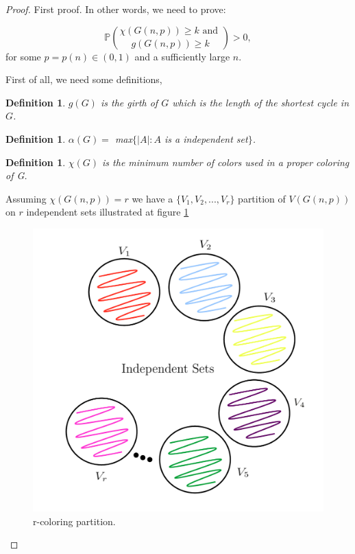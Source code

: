 \documentclass[12pt,twoside,a4paper]{book}
\numberwithin{equation}{section}
\newtheorem{definition}	[theorem] {Definition}
\theoremstyle{remark}
\begin{document}
\begin{proof} First proof.
In other words, we need to prove:

$$\mathbb{P}\binom{\chi(G(n,p)) \geq k \text{ and }} {g(G(n,p)) \geq k} > 0 ,$$
for some $p =p(n) \in (0,1)$ and a sufficiently large $n$.

First of all, we need some definitions,
\begin{definition}\label{def:girth}
$g(G)$ is the girth of $G$ which is the length of the shortest cycle in $G$. 
\end{definition}
\begin{definition}\label{def:independencenumber}
$\alpha(G) =$ max$\{|A|: A$ is a independent set$\}$.
\end{definition}
\begin{definition}\label{def:chromaticnumber}
$\chi(G)$ is the minimum number of colors used in a proper coloring of G.
\end{definition}
Assuming $\chi(G(n,p)) = r$ we have a $\{V_1,V_2,...,V_r\}$ partition of $V(G(n,p))$ on $r$ independent sets illustrated at figure \ref{fig:r-partition}

\begin{figure}[!htb]
     \centering
     \includegraphics[scale=1]{Figuras/r-partion.jpg}
     \caption{r-coloring partition. }
     \label{fig:r-partition}
\end{figure}


\end{proof}
\end{document}
